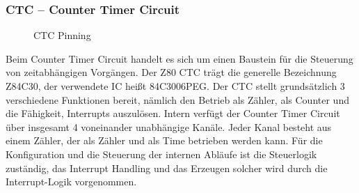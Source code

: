 \subsubsection{CTC -- Counter Timer Circuit}
\begin{figure}[H]
    \qquad
    \qquad
    \caption[Z80 CTC Pinning]{CTC Pinning \cite{z80:ctc}}
    \label{fig:z80-ctc-pinning}
\end{figure}

Beim Counter Timer Circuit handelt es sich um einen Baustein für die Steuerung von zeitabhängigen Vorgängen. Der Z80 CTC trägt die generelle Bezeichnung Z84C30, der verwendete IC heißt 84C3006PEG. Der CTC stellt grundsätzlich 3 verschiedene Funktionen bereit, nämlich den Betrieb als Zähler, als Counter und die Fähigkeit, Interrupts auszulösen. Intern verfügt der Counter Timer Circuit über insgesamt 4 voneinander unabhängige Kanäle. Jeder Kanal besteht aus einem Zähler, der als Zähler und als Time betrieben werden kann. Für die Konfiguration und die Steuerung der internen Abläufe ist die Steuerlogik zuständig, das Interrupt Handling und das Erzeugen solcher wird durch die Interrupt-Logik vorgenommen.

